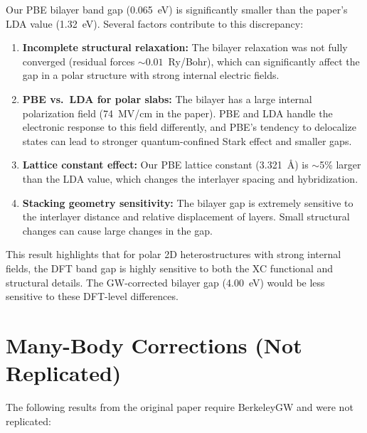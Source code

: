 \documentclass[11pt]{article}
\begin{document}
Our PBE bilayer band gap (0.065~eV) is significantly smaller than the paper's LDA value (1.32~eV). Several factors contribute to this discrepancy:

\begin{enumerate}
    \item \textbf{Incomplete structural relaxation:} The bilayer relaxation was not fully converged (residual forces $\sim 0.01$~Ry/Bohr), which can significantly affect the gap in a polar structure with strong internal electric fields.
    
    \item \textbf{PBE vs.\ LDA for polar slabs:} The bilayer has a large internal polarization field (74~MV/cm in the paper). PBE and LDA handle the electronic response to this field differently, and PBE's tendency to delocalize states can lead to stronger quantum-confined Stark effect and smaller gaps.
    
    \item \textbf{Lattice constant effect:} Our PBE lattice constant (3.321~\AA) is $\sim$5\% larger than the LDA value, which changes the interlayer spacing and hybridization.
    
    \item \textbf{Stacking geometry sensitivity:} The bilayer gap is extremely sensitive to the interlayer distance and relative displacement of layers. Small structural changes can cause large changes in the gap.
\end{enumerate}

This result highlights that for polar 2D heterostructures with strong internal fields, the DFT band gap is highly sensitive to both the XC functional and structural details. The GW-corrected bilayer gap (4.00~eV) would be less sensitive to these DFT-level differences.

\section{Many-Body Corrections (Not Replicated)}

The following results from the original paper require BerkeleyGW and were not replicated:
\end{document}
